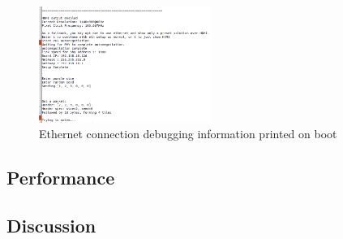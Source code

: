 \documentclass[11pt]{article}
\begin{document}
\begin{figure}[h]
  \centering
  \includegraphics[width=0.5\textwidth]{eth_serialout}
  \caption{Ethernet connection debugging information printed on boot}
\end{figure}

\subsection{Performance}\label{sec:performance}


\subsection{Discussion}

\end{document}
